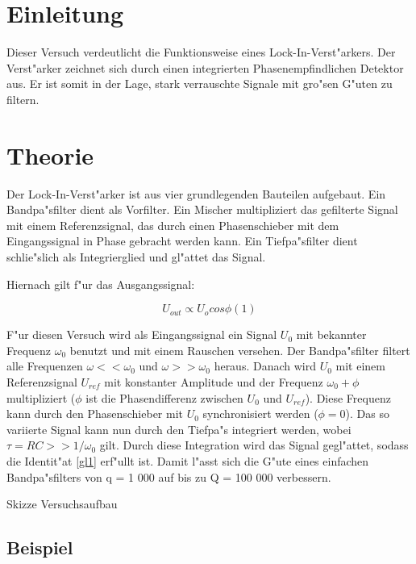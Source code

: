 \documentclass{scrartcl}
\begin{document}
	\section{Einleitung}

		Dieser Versuch verdeutlicht die Funktionsweise eines Lock-In-Verst"arkers.
		Der Verst"arker zeichnet sich durch einen integrierten Phasenempfindlichen Detektor aus.
		Er ist somit in der Lage, stark verrauschte Signale mit gro"sen G"uten zu filtern.


	\section{Theorie}

		Der Lock-In-Verst"arker ist aus vier grundlegenden Bauteilen aufgebaut.
		Ein Bandpa"sfilter dient als Vorfilter. Ein Mischer multipliziert das gefilterte Signal mit einem Referenzsignal,
		das durch einen Phasenschieber mit dem Eingangssignal in Phase gebracht werden kann.
		Ein Tiefpa"sfilter dient schlie"slich als Integrierglied und gl"attet das Signal.

		Hiernach gilt f"ur das Ausgangssignal:

		\begin{equation}
			\label{gl1}
			U_{out} \propto U_o cos \phi (1)
		\end{equation}

		F"ur diesen Versuch wird als Eingangssignal ein Signal $U_0$ mit bekannter Frequenz $\omega_0$ benutzt und mit einem Rauschen versehen.
		Der Bandpa"sfilter filtert alle Frequenzen $\omega << \omega_0$ und $\omega >> \omega_0$ heraus.
		Danach wird $U_0$ mit einem Referenzsignal $U_{ref}$ mit konstanter Amplitude und der Frequenz $\omega_0 + \phi$ multipliziert ($\phi$ ist die Phasendifferenz zwischen $U_0$ und $U_{ref}$).
		Diese Frequenz kann durch den Phasenschieber mit $U_0$ synchronisiert werden ($\phi = 0$). Das so variierte Signal kann nun durch den Tiefpa"s integriert werden,
		wobei $\tau = RC >> 1/\omega_0$ gilt.
		Durch diese Integration wird das Signal gegl"attet, sodass die Identit"at \ref{gl1} erf"ullt ist.
		Damit l"asst sich die G"ute eines einfachen Bandpa"sfilters von q = 1 000 auf bis zu Q = 100 000 verbessern.


		Skizze Versuchsaufbau

		\label{beispiel}
		\subsection{Beispiel} 
\end{document}
